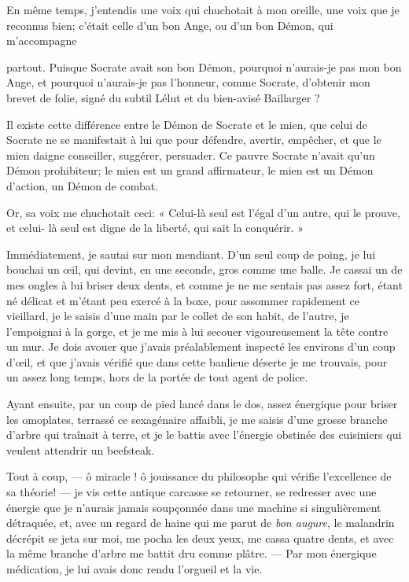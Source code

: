 En même temps, j’entendis une voix qui chuchotait à mon
oreille, une voix que je reconnus bien; c’était celle
d’un bon Ange, ou d’un bon Démon, qui
m’accompagne \linebreak

\quebra

\noindent{}partout. Puisque Socrate avait son bon
Démon, pourquoi n’aurais{}-je pas mon bon Ange, et
pourquoi n’aurais{}-je pas l’honneur,
comme Socrate, d’obtenir mon brevet de folie, signé du
subtil Lélut et du bien{}-avisé Baillarger ?

Il existe cette différence entre le Démon de Socrate et le mien, que
celui de Socrate ne se manifestait à lui que pour défendre, avertir,
empêcher, et que le mien daigne conseiller, suggérer, persuader. Ce
pauvre Socrate n’avait qu’un Démon
prohibiteur; le mien est un grand affirmateur, le mien est un Démon
d’action, un Démon de combat.

Or, sa voix me chuchotait ceci: « Celui{}-là seul est
l’égal d’un autre, qui le prouve, et
celui{}- là seul est digne de la liberté, qui sait la conquérir. »

Immédiatement, je sautai sur mon mendiant. D’un seul
coup de poing, je lui bouchai un \oe il, qui devint, en une seconde, gros
comme une balle. Je cassai un de mes ongles à lui briser deux dents, et
comme je ne me sentais pas assez fort, étant né délicat et
m’étant peu exercé à la boxe, pour assommer rapidement
ce vieillard, je le saisis d’une main par le collet de
son habit, de l’autre, je l’empoignai
à la gorge, et je me mis à lui secouer vigoureusement la tête contre un
mur. Je dois avouer que j’avais préalablement inspecté
les environs d’un coup d’\oe il, et que
j’avais vérifié que dans cette banlieue déserte je me
trouvais, pour un assez long temps, hors de la portée de tout agent de
police.

Ayant ensuite, par un coup de pied lancé dans le dos, assez énergique
pour briser les omoplates, terrassé ce sexagénaire affaibli, je me
saisis d’une grosse branche d’arbre
qui traînait à terre, et je le battis avec l’énergie
obstinée des cuisiniers qui veulent attendrir un beefsteak.

Tout à coup, --- ô miracle ! ô jouissance du philosophe qui vérifie
l’excellence de sa théorie! --- je vis cette antique
carcasse se retourner, se redresser avec une énergie que je
n’aurais jamais soupçonnée dans une machine si
singulièrement détraquée, et, avec un regard de haine qui me parut de
\textit{bon augure}, le malandrin décrépit se jeta sur moi, me pocha les deux
yeux, me cassa quatre dents, et avec la même branche
d’arbre me battit dru comme plâtre. --- Par mon
énergique médication, je lui avais donc rendu
l’orgueil et la vie.

